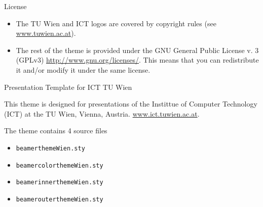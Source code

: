 
\begin{frame}{License}
  
\begin{itemize}
\item The TU Wien and ICT logos are covered by copyright rules (see
  \href{www.tuwien.ac.at}{www.tuwien.ac.at}).
\item The rest of the theme is provided under the GNU General Public
  License v. 3 (GPLv3) \href{http://www.gnu.org/licenses/}{http://www.gnu.org/licenses/}. This means that you can redistribute it and/or modify it under the same license. 
\end{itemize}
\end{frame}


\begin{frame}{Presentation Template for ICT TU Wien}

  \begin{block}{}
    This theme is designed for presentations of the Instittue of
    Computer Technology (ICT) at the TU Wien, Vienna, Austria.
    \href{www.ict.tuwien.ac.at}{www.ict.tuwien.ac.at}.
  \end{block}

  \vspace{3ex}
  \begin{block}{The theme contains 4 source files}

  \begin{itemize}
  \item  {\tt beamerthemeWien.sty}
  \item  {\tt beamercolorthemeWien.sty}
  \item  {\tt beamerinnerthemeWien.sty}
  \item  {\tt beamerouterthemeWien.sty}
  \end{itemize}
\end{block}
\end{frame} 

